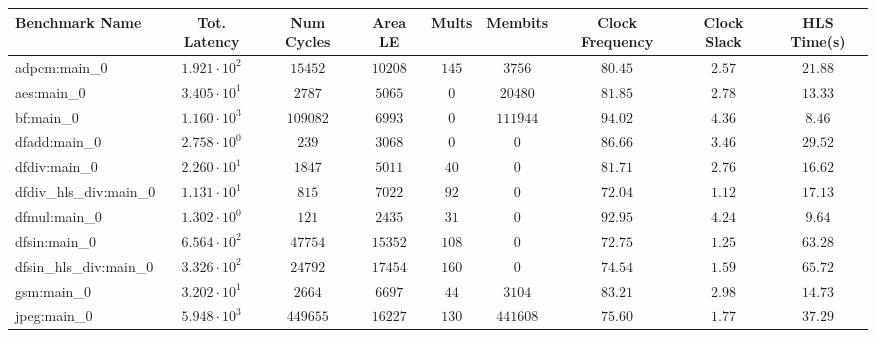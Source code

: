 \begin{tabular}{|l|c|c|c|c|c|c|c|c|}
\hline
Benchmark Name          & Tot. Latency           & Num Cycles & Area LE    & Mults   & Membits    & Clock Frequency & Clock Slack & HLS Time(s) \\
\hline
adpcm:main\_0           & $ 1.921 \cdot 10^{2} $ & $ 15452  $ & $ 10208  $ & $ 145 $ & $ 3756   $ & $ 80.45       $ & $ 2.57    $ & $ 21.88   $ \\
aes:main\_0             & $ 3.405 \cdot 10^{1} $ & $ 2787   $ & $ 5065   $ & $ 0   $ & $ 20480  $ & $ 81.85       $ & $ 2.78    $ & $ 13.33   $ \\
bf:main\_0              & $ 1.160 \cdot 10^{3} $ & $ 109082 $ & $ 6993   $ & $ 0   $ & $ 111944 $ & $ 94.02       $ & $ 4.36    $ & $ 8.46    $ \\
dfadd:main\_0           & $ 2.758 \cdot 10^{0} $ & $ 239    $ & $ 3068   $ & $ 0   $ & $ 0      $ & $ 86.66       $ & $ 3.46    $ & $ 29.52   $ \\
dfdiv:main\_0           & $ 2.260 \cdot 10^{1} $ & $ 1847   $ & $ 5011   $ & $ 40  $ & $ 0      $ & $ 81.71       $ & $ 2.76    $ & $ 16.62   $ \\
dfdiv\_hls\_div:main\_0 & $ 1.131 \cdot 10^{1} $ & $ 815    $ & $ 7022   $ & $ 92  $ & $ 0      $ & $ 72.04       $ & $ 1.12    $ & $ 17.13   $ \\
dfmul:main\_0           & $ 1.302 \cdot 10^{0} $ & $ 121    $ & $ 2435   $ & $ 31  $ & $ 0      $ & $ 92.95       $ & $ 4.24    $ & $ 9.64    $ \\
dfsin:main\_0           & $ 6.564 \cdot 10^{2} $ & $ 47754  $ & $ 15352  $ & $ 108 $ & $ 0      $ & $ 72.75       $ & $ 1.25    $ & $ 63.28   $ \\
dfsin\_hls\_div:main\_0 & $ 3.326 \cdot 10^{2} $ & $ 24792  $ & $ 17454  $ & $ 160 $ & $ 0      $ & $ 74.54       $ & $ 1.59    $ & $ 65.72   $ \\
gsm:main\_0             & $ 3.202 \cdot 10^{1} $ & $ 2664   $ & $ 6697   $ & $ 44  $ & $ 3104   $ & $ 83.21       $ & $ 2.98    $ & $ 14.73   $ \\
jpeg:main\_0            & $ 5.948 \cdot 10^{3} $ & $ 449655 $ & $ 16227  $ & $ 130 $ & $ 441608 $ & $ 75.60       $ & $ 1.77    $ & $ 37.29   $ \\

\end{tabular}
